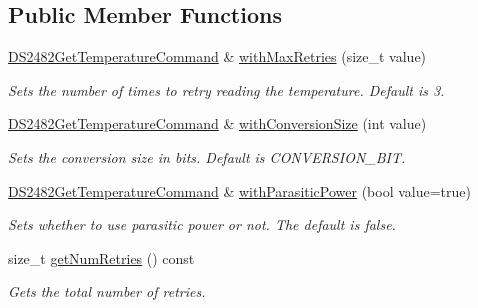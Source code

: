\subsection*{Public Member Functions}
\begin{DoxyCompactItemize}
\item 
\mbox{\label{class_d_s2482_get_temperature_command_a49764ff0b2607839893d2362e6b894c2}} 
\mbox{\hyperlink{class_d_s2482_get_temperature_command}{D\+S2482\+Get\+Temperature\+Command}} \& \mbox{\hyperlink{class_d_s2482_get_temperature_command_a49764ff0b2607839893d2362e6b894c2}{with\+Max\+Retries}} (size\+\_\+t value)
\begin{DoxyCompactList}\small\item\em Sets the number of times to retry reading the temperature. Default is 3. \end{DoxyCompactList}\item 
\mbox{\hyperlink{class_d_s2482_get_temperature_command}{D\+S2482\+Get\+Temperature\+Command}} \& \mbox{\hyperlink{class_d_s2482_get_temperature_command_a74bf428300575cfc62e57bbdb5d358ac}{with\+Conversion\+Size}} (int value)
\begin{DoxyCompactList}\small\item\em Sets the conversion size in bits. Default is C\+O\+N\+V\+E\+R\+S\+I\+O\+N\+\_\+B\+IT. \end{DoxyCompactList}\item 
\mbox{\label{class_d_s2482_get_temperature_command_a69481de9ee23a9c8c46d724fffc8eff7}} 
\mbox{\hyperlink{class_d_s2482_get_temperature_command}{D\+S2482\+Get\+Temperature\+Command}} \& \mbox{\hyperlink{class_d_s2482_get_temperature_command_a69481de9ee23a9c8c46d724fffc8eff7}{with\+Parasitic\+Power}} (bool value=true)
\begin{DoxyCompactList}\small\item\em Sets whether to use parasitic power or not. The default is false. \end{DoxyCompactList}\item 
size\+\_\+t \mbox{\hyperlink{class_d_s2482_get_temperature_command_a39a243094572d16385d8ef2ae5180d1f}{get\+Num\+Retries}} () const
\begin{DoxyCompactList}\small\item\em Gets the total number of retries. \end{DoxyCompactList}\end{DoxyCompactItemize}
